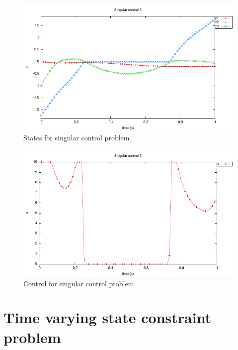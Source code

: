 \documentclass[a4paper,11pt]{report}    %
\begin{document}
\begin{figure}
  \centering 
  \includegraphics{../examples/sing5/sing5_states}
  \caption{States for singular control problem}
 \label{fig:sing5_states}
\end{figure}


\begin{figure}
  \centering
  \includegraphics{../examples/sing5/sing5_control}
  \caption{Control for singular control problem}
 \label{fig:sing5_control}
\end{figure}


\section{Time varying state constraint problem}
\end{document}
